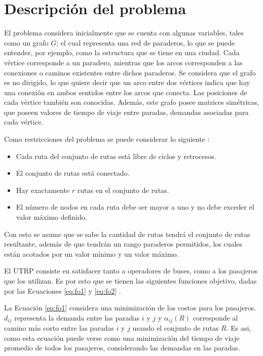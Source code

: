 \section{Descripción del problema}

El problema considera inicialmente que se cuenta con algunas variables, tales como un grafo $G$; el cual representa una red de paraderos, lo que se puede entender, por ejemplo, como la estructura que se tiene en una ciudad. Cada vértice corresponde a un paradero, mientras que los arcos corresponden a las conexiones o caminos existentes entre dichos paraderos. Se considera que el grafo es no dirigido, lo que quiere decir que un arco entre dos vértices indica que hay una conexión en ambos sentidos entre los arcos que conecta. Las posiciones de cada vértice también son conocidas. Además, este grafo posee matrices simétricas, que poseen valores de tiempo de viaje entre paradas, demandas asociadas para cada vértice.

Como restricciones del problema se puede considerar lo siguiente \cite{NewHaEOps}:
\begin{itemize}
\item Cada ruta del conjunto de rutas está libre de ciclos y retrocesos.
\item El conjunto de rutas está conectado.
\item Hay exactamente $r$ rutas en el conjunto de rutas.
\item El número de nodos en cada ruta debe ser mayor a uno y no debe exceder el valor máximo definido.
\end{itemize} 

Con esto se asume que se sabe la cantidad de rutas tendrá el conjunto de rutas resultante, además de que tendrán un rango paraderos permitidos, los cuales están acotados por un valor mínimo y un valor máximo.

El UTRP consiste en satisfacer tanto a operadores de buses, como a los pasajeros que los utilizan. Es por esto que se tienen las siguientes funciones objetivo, dadas por las Ecuaciones \eqref{eq:fo1} y \eqref{eq:fo2} \cite{NewHaEOps}.

La Ecuación \eqref{eq:fo1} considera una minimización de los costos para los pasajeros. $d_{ij}$ representa la demanda  entre las paradas $i$ y $j$ y $\alpha_{ij}(R)$ corresponde al camino más corto entre las paradas $i$ y $j$ usando el conjunto de rutas $R$. Es asi, como esta ecuación puede verse como una minimización del tiempo de viaje promedio de todos los pasajeros, considerando las demandas en las paradas.

